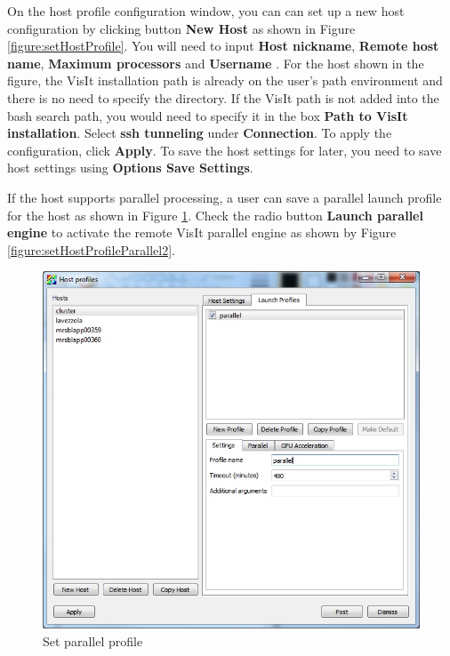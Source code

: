 \documentclass[12pt]{report}
\begin{document}
On the host profile configuration window, you can can set up a  new host configuration by clicking button {\bf New Host} as shown in Figure \ref{figure:setHostProfile}.  You will need to input {\bf Host nickname}, {\bf Remote host name}, {\bf Maximum processors} and {\bf Username }. For the host shown in the figure, the VisIt installation path is already on the user's path environment and there is no need to specify the directory. If the VisIt path is not added into the bash search path, you would need to specify it in the box  {\bf Path to VisIt installation}.  Select {\bf ssh tunneling} under {\bf Connection}. To apply the configuration, click {\bf Apply}. To save the host settings for later, you need to save host settings using {\bf Options \textrightarrow Save Settings}.


If the host supports parallel processing, a user can save a parallel launch profile for the host as shown in Figure \ref{figure:setHostProfileParallel1}. Check the radio button {\bf Launch parallel engine} to activate the remote VisIt parallel engine as shown by Figure \ref{figure:setHostProfileParallel2}.   

        \begin{figure}
        \begin{center}
        \includegraphics{setHostProfileParallel1}
        \caption{Set parallel profile}
        \label{figure:setHostProfileParallel1}
        \end{center}
        \end{figure}
\end{document}
